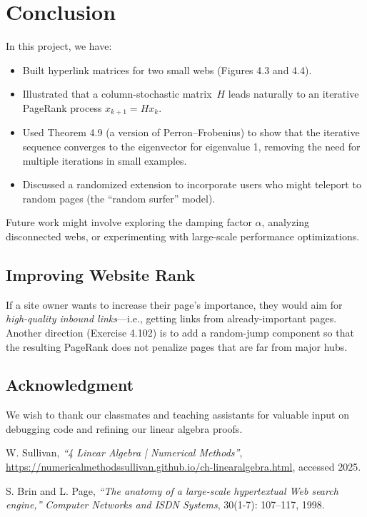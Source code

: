 \documentclass{article}
\begin{document}
\section{Conclusion}
In this project, we have:
\begin{itemize}
  \item Built hyperlink matrices for two small webs (Figures 4.3 and 4.4).
  \item Illustrated that a column-stochastic matrix \(\,H\) leads naturally to an iterative PageRank process \(x_{k+1} = Hx_k\).
  \item Used Theorem 4.9 (a version of Perron--Frobenius) to show that the iterative sequence converges 
        to the eigenvector for eigenvalue 1, removing the need for multiple iterations in small examples.
  \item Discussed a randomized extension to incorporate users who might teleport to random pages (the ``random surfer'' model).
\end{itemize}
Future work might involve exploring the damping factor \(\alpha\), analyzing disconnected webs, or 
experimenting with large-scale performance optimizations.

\subsection*{Improving Website Rank}      
If a site owner wants to increase their page's importance, they would aim for \emph{high-quality inbound links}---i.e., 
getting links from already-important pages. Another direction (Exercise 4.102) is to add a random-jump component 
so that the resulting PageRank does not penalize pages that are far from major hubs.

\subsection*{Acknowledgment}
We wish to thank our classmates and teaching assistants for valuable input on debugging code and refining 
our linear algebra proofs.

\begin{thebibliography}{9}

W. Sullivan,
\textit{``4 Linear Algebra | Numerical Methods''},
\url{https://numericalmethodssullivan.github.io/ch-linearalgebra.html}, 
accessed 2025.

S. Brin and L. Page,
\textit{``The anatomy of a large-scale hypertextual Web search engine,''}
\emph{Computer Networks and ISDN Systems}, 30(1-7): 107--117, 1998.

\end{thebibliography}
\end{document}

